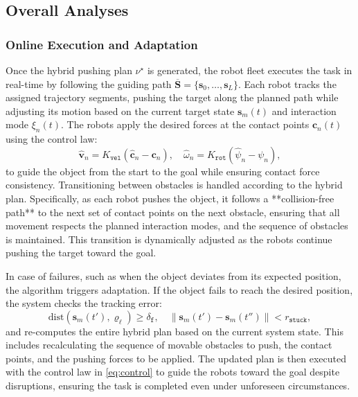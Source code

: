 \subsection{Overall Analyses}\label{subsec:overall}


\subsubsection{Online Execution and Adaptation}\label{subsec:execute}

Once the hybrid pushing plan $\nu^\star$ is generated, the robot fleet executes the task
in real-time by following the guiding path $\overline{\mathbf{S}} = \{\mathbf{s}_0, \dots,
\mathbf{s}_L\}$. Each robot tracks the assigned trajectory segments, pushing the target
along the planned path while adjusting its motion based on the current target state
$\mathbf{s}_m(t)$ and interaction mode $\xi_n(t)$. The robots apply the desired forces
at the contact points $\mathbf{c}_n(t)$ using the control law:
\[
  \widehat{\mathbf{v}}_n = K_{\texttt{vel}} \left(\widehat{\mathbf{c}}_n - \mathbf{c}_n\right), \quad
  \widehat{\omega}_n = K_{\texttt{rot}} \left(\widehat{\psi}_n - \psi_n\right),
\]
to guide the object from the start to the goal while ensuring contact force consistency.
Transitioning between obstacles is handled according to the hybrid plan. Specifically,
as each robot pushes the object, it follows a **collision-free path** to the next set of
contact points on the next obstacle, ensuring that all movement respects the planned
interaction modes, and the sequence of obstacles is maintained. This transition is dynamically
adjusted as the robots continue pushing the target toward the goal.

In case of failures, such as when the object deviates from its expected position,
the algorithm triggers adaptation. If the object fails to reach the desired position,
the system checks the tracking error:
\[
  \mathrm{dist}(\mathbf{s}_m(t'), \varrho_\ell) \geq \delta_{\texttt{f}}, \quad
  \|\mathbf{s}_m(t') - \mathbf{s}_m(t'')\| < r_{\texttt{stuck}},
\]
and re-computes the entire hybrid plan based on the current system state. This includes
recalculating the sequence of movable obstacles to push, the contact points, and the
pushing forces to be applied. The updated plan is then executed with the control law in
\eqref{eq:control} to guide the robots toward the goal despite disruptions, ensuring
the task is completed even under unforeseen circumstances.



